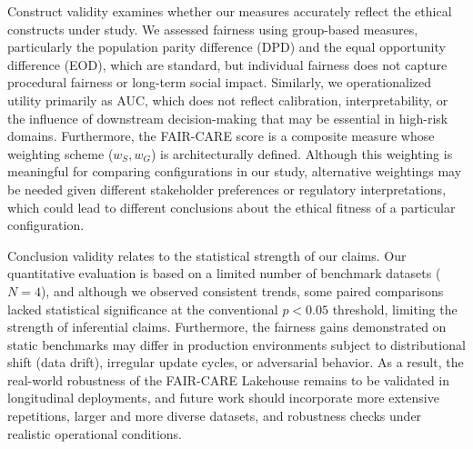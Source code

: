 Construct validity examines whether our measures accurately reflect the ethical constructs under study. We assessed fairness using group-based measures, particularly the population parity difference (DPD) and the equal opportunity difference (EOD), which are standard, but individual fairness does not capture procedural fairness or long-term social impact. Similarly, we operationalized utility primarily as AUC, which does not reflect calibration, interpretability, or the influence of downstream decision-making that may be essential in high-risk domains. Furthermore, the FAIR-CARE score is a composite measure whose weighting scheme ($w_S, w_G$) is architecturally defined. Although this weighting is meaningful for comparing configurations in our study, alternative weightings may be needed given different stakeholder preferences or regulatory interpretations, which could lead to different conclusions about the ethical fitness of a particular configuration.

Conclusion validity relates to the statistical strength of our claims. Our quantitative evaluation is based on a limited number of benchmark datasets ($N=4$), and although we observed consistent trends, some paired comparisons lacked statistical significance at the conventional $p < 0.05$ threshold, limiting the strength of inferential claims. Furthermore, the fairness gains demonstrated on static benchmarks may differ in production environments subject to distributional shift (data drift), irregular update cycles, or adversarial behavior. As a result, the real-world robustness of the FAIR-CARE Lakehouse remains to be validated in longitudinal deployments, and future work should incorporate more extensive repetitions, larger and more diverse datasets, and robustness checks under realistic operational conditions.

